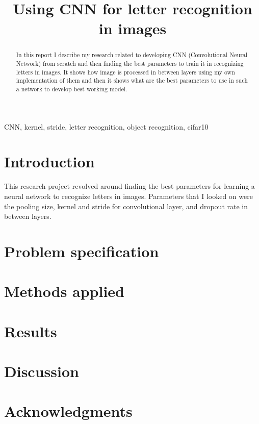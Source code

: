 \documentclass[conference]{IEEEtran}
\begin{document}
\title{Using CNN for letter recognition in images}

\author{
}

\maketitle

\begin{abstract}
In this report I describe my research related to developing CNN (Convolutional Neural Network) from scratch and then finding the best parameters to train it in recognizing letters in images. It shows how image is processed in between layers using my own implementation of them and then it shows what are the best parameters to use in such a network to develop best working model.
\end{abstract}

\begin{IEEEkeywords}
CNN, kernel, stride, letter recognition, object recognition, cifar10
\end{IEEEkeywords}

\section{Introduction}
This research project revolved around finding the best parameters for learning a neural network to recognize letters in images. Parameters that I looked on were the pooling size, kernel and stride for convolutional layer, and dropout rate in between layers.

\section{Problem specification}
\section{Methods applied}
\section{Results}
\section{Discussion}


\section*{Acknowledgments}



\end{document}
